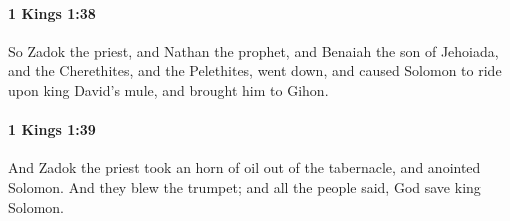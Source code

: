 		\paragraph{1 Kings 1:38} %
			\label{1KINGS-1-38}

			So Zadok the priest, and Nathan the prophet, and Benaiah the son of Jehoiada, and the Cherethites, and the Pelethites, went down, and caused Solomon to ride upon king David’s mule, and brought him to Gihon.


		\paragraph{1 Kings 1:39} %
			\label{1KINGS-1-39}

			And Zadok the priest took an horn of oil out of the tabernacle, and anointed Solomon. And they blew the trumpet; and all the people said, God save king Solomon.


